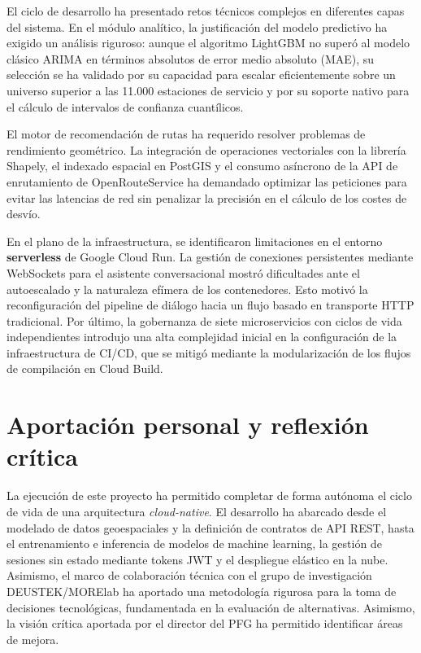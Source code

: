 El ciclo de desarrollo ha presentado retos técnicos complejos en diferentes capas del sistema.
En el módulo analítico, la justificación del modelo predictivo ha exigido un análisis riguroso: aunque el algoritmo LightGBM no superó
al modelo clásico ARIMA en términos absolutos de error medio absoluto (MAE), su selección se ha validado por su capacidad para escalar
eficientemente sobre un universo superior a las 11.000 estaciones de servicio y por su soporte nativo para el cálculo de intervalos
de confianza cuantílicos.

El motor de recomendación de rutas ha requerido resolver problemas de rendimiento geométrico. La integración de operaciones vectoriales
con la librería Shapely, el indexado espacial en PostGIS y el consumo asíncrono de la API de enrutamiento de OpenRouteService
ha demandado optimizar las peticiones para evitar las latencias de red sin penalizar la precisión en el cálculo de los costes de desvío.

En el plano de la infraestructura, se identificaron limitaciones en el entorno \textbf{serverless}  de Google Cloud Run. La gestión de conexiones
persistentes mediante WebSockets para el asistente conversacional mostró dificultades ante el autoescalado y la naturaleza efímera de
los contenedores. Esto motivó la reconfiguración del pipeline de diálogo hacia un flujo basado en transporte HTTP tradicional.
Por último, la gobernanza de siete microservicios con ciclos de vida independientes introdujo una alta complejidad inicial en la
configuración de la infraestructura de CI/CD, que se mitigó mediante la modularización de los flujos de compilación en Cloud Build.

\section{Aportación personal y reflexión crítica}
\label{sec:aportacion-personal}

La ejecución de este proyecto ha permitido completar de forma autónoma el ciclo de vida de una arquitectura \textit{cloud-native}.
El desarrollo ha abarcado desde el modelado de datos geoespaciales y la definición de contratos de API REST, hasta el entrenamiento
e inferencia de modelos de machine learning, la gestión de sesiones sin estado mediante tokens JWT y el despliegue elástico en la nube.
Asimismo, el marco de colaboración técnica con el grupo de investigación DEUSTEK/MORElab ha aportado una metodología rigurosa para la toma de
decisiones tecnológicas, fundamentada en la evaluación de alternativas. Asimismo, la visión crítica aportada por el director del PFG
ha permitido identificar áreas de mejora. 

